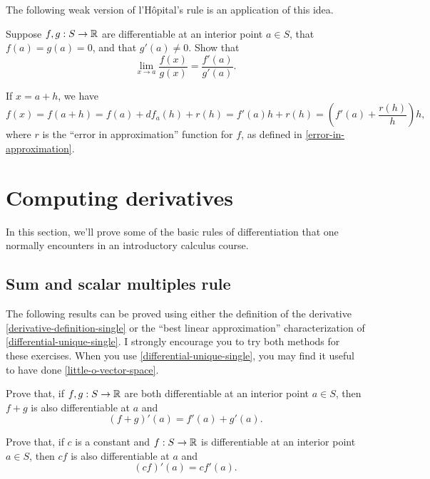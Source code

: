 The following weak version of l'H\^opital's rule is an application of this idea. 

\begin{exercise} \label{weak-lhopital}
	Suppose $f, g : S \to \mathbb{R}$ are differentiable at an interior point $a \in S$, that $f(a) = g(a) = 0$, and that $g'(a) \neq 0$. Show that
	\[ \lim_{x \to a} \frac{f(x)}{g(x)} = \frac{f'(a)}{g'(a)}. \]
	\begin{hint} If $x = a+h$, we have
	\[ f(x) = f(a+h) = f(a) + df_a(h) + r(h) = f'(a)h + r(h) = \left( f'(a) + \frac{r(h)}{h} \right)h, \]
	where $r$ is the ``error in approximation'' function for $f$, as defined in \cref{error-in-approximation}. 
	\end{hint}
\end{exercise}

\section{Computing derivatives}

In this section, we'll prove some of the basic rules of differentiation that one normally encounters in an introductory calculus course. 

\subsection{Sum and scalar multiples rule}

The following results can be proved using either the definition of the derivative \ref{derivative-definition-single} or the ``best linear approximation'' characterization of \cref{differential-unique-single}. I strongly encourage you to try both methods for these exercises. 
When you use \cref{differential-unique-single}, you may find it useful to have done \cref{little-o-vector-space}. 

\begin{exercise} \label{sum-rule-single} 
	Prove that, if $f, g : S \to \mathbb{R}$ are both differentiable at an interior point $a \in S$, then $f + g$ is also differentiable at $a$ and \[ (f+g)'(a) = f'(a) + g'(a). \]
\end{exercise}

\begin{exercise}  \label{scalar-multiples-rule-single}
	Prove that, if $c$ is a constant and $f : S \to \mathbb{R}$ is differentiable at an interior point $a \in S$, then $cf$ is also differentiable at $a$ and \[ (cf)'(a) = c f'(a). \]
\end{exercise}

